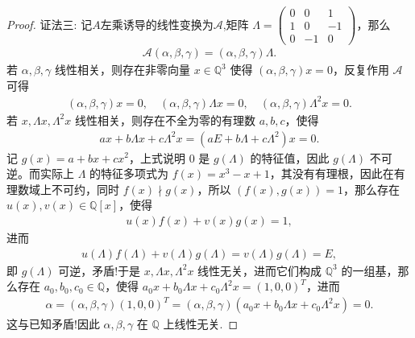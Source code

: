 \documentclass[../../main.tex]{subfiles}%
\begin{document}
\begin{proof}
{\color{blue}证法三:}
记$A$左乘诱导的线性变换为$\mathscr{A}$,矩阵 $\Lambda = \begin{pmatrix} 0 & 0 & 1 \\ 1 & 0 & -1 \\ 0 & -1 & 0 \end{pmatrix}$，那么
\begin{align*}
\mathscr{A}(\alpha, \beta, \gamma) = (\alpha, \beta, \gamma)\Lambda.
\end{align*}
若 $\alpha, \beta, \gamma$ 线性相关，则存在非零向量 $x \in \mathbb{Q}^3$ 使得 $(\alpha, \beta, \gamma)x = 0$，反复作用 $\mathscr{A}$ 可得
\begin{align*}
(\alpha, \beta, \gamma)x = 0, \quad (\alpha, \beta, \gamma)\Lambda x = 0, \quad (\alpha, \beta, \gamma)\Lambda ^2x = 0.
\end{align*}
若 $x, \Lambda x, \Lambda^2x$ 线性相关，则存在不全为零的有理数 $a, b, c$，使得
\begin{align*}
ax + b\Lambda x + c\Lambda ^2x = (aE + b\Lambda  + c\Lambda ^2)x = 0.
\end{align*}
记 $g(x) = a+bx+cx^2$，上式说明 $0$ 是 $g(\Lambda)$ 的特征值，因此 $g(\Lambda)$ 不可逆。而实际上 $\Lambda$ 的特征多项式为 $f(x) = x^3 - x + 1$，其没有有理根，因此在有理数域上不可约，同时 $f(x) \nmid g(x)$，所以 $(f(x), g(x)) = 1$，那么存在 $u(x), v(x) \in \mathbb{Q}[x]$，使得
\begin{align*}
u(x)f(x) + v(x)g(x) = 1,
\end{align*}
进而
\begin{align*}
u(\Lambda )f(\Lambda ) + v(\Lambda )g(\Lambda ) = v(\Lambda )g(\Lambda ) = E,
\end{align*}
即 $g(\Lambda)$ 可逆，矛盾!于是 $x, \Lambda x, \Lambda^2x$ 线性无关，进而它们构成 $\mathbb{Q}^3$ 的一组基，那么存在 $a_0, b_0, c_0 \in \mathbb{Q}$，使得 $a_0x + b_0\Lambda x + c_0\Lambda ^2x = (1, 0, 0)^T$，进而
\begin{align*}
\alpha = (\alpha, \beta, \gamma)(1, 0, 0)^T = (\alpha, \beta, \gamma)(a_0x + b_0\Lambda x + c_0\Lambda ^2x) = 0.
\end{align*}
这与已知矛盾!因此 $\alpha, \beta, \gamma$ 在 $\mathbb{Q}$ 上线性无关.
\end{proof}
\end{document}
